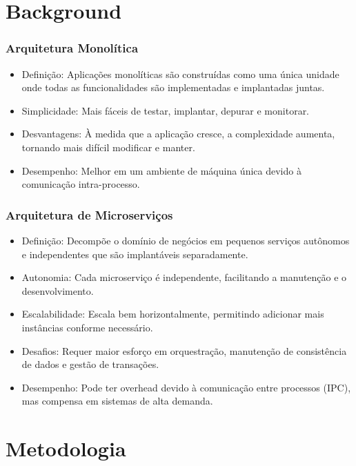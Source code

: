 \documentclass{beamer}
\begin{document}
\section{Background}

\begin{frame}
\frametitle{Arquitetura Monolítica}

\begin{itemize}
    \item Definição: Aplicações monolíticas são construídas como uma única unidade onde todas as funcionalidades são implementadas e implantadas juntas.
    \item Simplicidade: Mais fáceis de testar, implantar, depurar e monitorar.
    \item Desvantagens: À medida que a aplicação cresce, a complexidade aumenta, tornando mais difícil modificar e manter.
    \item Desempenho: Melhor em um ambiente de máquina única devido à comunicação intra-processo.
\end{itemize}
\end{frame}

\begin{frame}
\frametitle{Arquitetura de Microserviços}
\begin{itemize}
    \item Definição: Decompõe o domínio de negócios em pequenos serviços autônomos e independentes que são implantáveis separadamente.
    \item Autonomia: Cada microserviço é independente, facilitando a manutenção e o desenvolvimento.
    \item Escalabilidade: Escala bem horizontalmente, permitindo adicionar mais instâncias conforme necessário.
    \item Desafios: Requer maior esforço em orquestração, manutenção de consistência de dados e gestão de transações.
    \item Desempenho: Pode ter overhead devido à comunicação entre processos (IPC), mas compensa em sistemas de alta demanda.
\end{itemize}
\end{frame}

\section{Metodologia}
\end{document}
